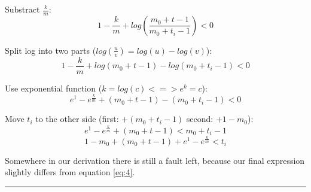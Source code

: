 \begin{enumerate}
	Substract $\frac{k}{m}$:
	\begin{equation*}
		1 - \frac{k}{m} + log(\frac{m_0 + t - 1}{m_0 + t_i - 1}) < 0
	\end{equation*}
	
	Split log into two parts ($log(\frac{u}{v}) = log(u) - log(v)$):
	\begin{equation*}
		1 - \frac{k}{m} + log(m_0 + t - 1) - log(m_0 + t_i - 1) < 0
	\end{equation*}
	
	Use exponential function ($k=log(c) <=> e^k=c$):
	\begin{equation*}
		e^1 - e^{\frac{k}{m}} + (m_0 + t - 1) - (m_0 + t_i - 1) < 0
	\end{equation*}
	
	Move $t_i$ to the other side (first: $+ (m_0 + t_i - 1)$ second: $+1 - m_0$):
	\begin{equation*}
		e^1 - e^{\frac{k}{m}} + (m_0 + t - 1) < m_0 + t_i - 1
	\end{equation*}
	\begin{equation*}
	1 - m_0 + (m_0 + t - 1) + e^1 - e^{\frac{k}{m}} < t_i
	\end{equation*}
	
	Somewhere in our derivation there is still a fault left, because our final expression slightly differs from equation \ref{eq:4}.
	
	\hrule \relax

\end{enumerate}